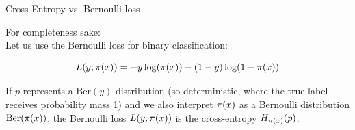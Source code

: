 
  
  

\begin{vbframe}{Cross-Entropy vs. Bernoulli loss}
    
For completeness sake:\\
  Let us use the Bernoulli loss for binary classification: 

  $$L(y,\pi(x)) = -y \log(\pi(x)) - (1 - y) \log (1 - \pi(x))$$

\lz

  If $p$ represents a $\text{Ber}(y)$ distribution (so deterministic, where the true label receives probability mass 1) and we also interpret $\pi(x)$ as a Bernoulli distribution $\text{Ber}(\pi(x))$, the Bernoulli loss $L(y,\pi(x))$ is the cross-entropy $H_{\pi(x)}(p)$.
\end{vbframe}

